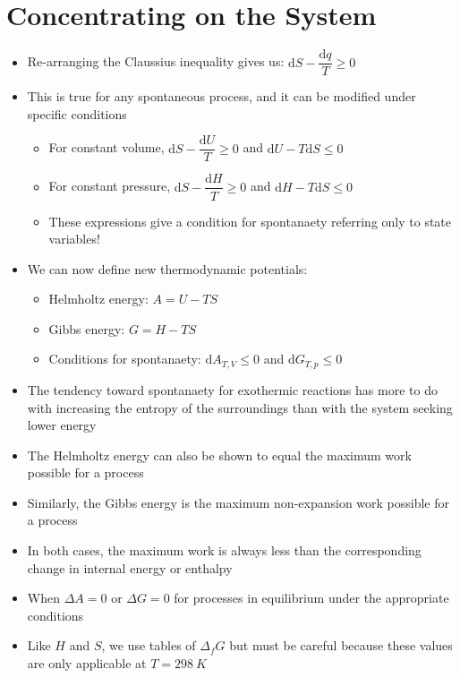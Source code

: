 \documentclass[12pt, openany, letterpaper]{memoir}
\begin{document}
\section{Concentrating on the System}
\begin{itemize}
	\item Re-arranging the Claussius inequality gives us: $\mathrm{d}S - \dfrac{\mathrm{d} q}{T} \geq 0$
	\item This is true for any spontaneous process, and it can be modified under specific conditions
	\begin{itemize}
		\item For constant volume, $\mathrm{d}S - \dfrac{\mathrm{d}U}{T}\geq0$ and $\mathrm{d}U-T\mathrm{d}S\leq0$
		\item For constant pressure, $\mathrm{d}S - \dfrac{\mathrm{d}H}{T}\geq0$ and $\mathrm{d}H - T\mathrm{d}S \leq 0$ 
		\item These expressions give a condition for spontanaety referring only to state variables!
	\end{itemize}
	\item We can now define new thermodynamic potentials:
	\begin{itemize}
		\item Helmholtz energy: $A = U - TS$
		\item Gibbs energy: $G = H-TS$
		\item Conditions for spontanaety: $\mathrm{d}A_{T,V}\leq0$ and $\mathrm{d}G_{T,p}\leq0$
	\end{itemize}
	\item The tendency toward spontanaety for exothermic reactions has more to do with increasing the entropy of the surroundings than with the system seeking lower energy
	\item The Helmholtz energy can also be shown to equal the maximum work possible for a process
	\item Similarly, the Gibbs energy is the maximum non-expansion work possible for a process
	\item In both cases, the maximum work is always less than the corresponding change in internal energy or enthalpy
	\item When $\Delta A=0$ or $\Delta G=0$ for processes in equilibrium under the appropriate conditions
	\item Like $H$ and $S$, we use tables of $\Delta_f G$ but must be careful because these values are only applicable at $T=298~K$
\end{itemize}
\end{document}
